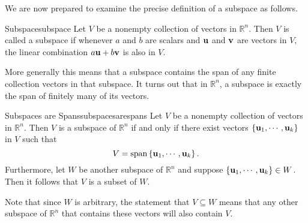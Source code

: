 We are now prepared to examine the precise definition of a subspace as follows.

\begin{definition}{Subspace}{subspace}
Let $V$ be a nonempty collection of vectors in $\mathbb{R}^{n}.$ Then
$V$ is called a subspace if whenever $a$ and $b$  are scalars and ${\bf u}$ and ${\bf v}$
are vectors in $V,$ the linear combination $a {\bf u}+ b {\bf v}$ is also in $V$.
\end{definition}

More generally this means that a subspace contains the span of any
finite collection vectors in that subspace. It turns out that in
$\mathbb{R}^{n}$, a subspace is exactly the span of finitely many of
its vectors.

\begin{theorem}{Subspaces are Spans}{subspacesarespans}
Let $V$ be a nonempty collection of vectors in $\mathbb{R}^{n}.$ Then $V$ is a subspace of $\mathbb{R}^{n}$ if and only if there
exist vectors $\left\{ {\bf u}_{1},\cdots ,{\bf u}_{k}\right\}$ in $V$ such that 
\[
V= \mbox{span}\left\{ {\bf u}_{1},\cdots ,{\bf u}_{k}\right\}. 
\]
Furthermore, let $W$ be another subspace of $\mathbb{R}^n$ and suppose $\left\{ {\bf u}_{1},\cdots ,{\bf u}_{k}\right\} \in W$. Then it follows that $V$ is a subset of $W$. 
\end{theorem}

Note that since $W$ is arbitrary, the statement that $V \subseteq W$ means that any other subspace of $\mathbb{R}^n$ that contains these vectors will also contain $V$. 

